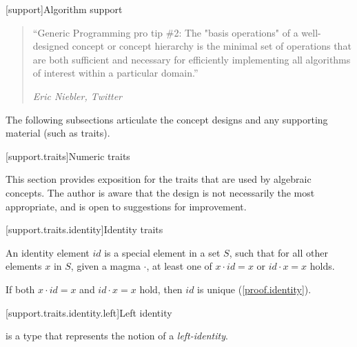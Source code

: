 [support]{Algorithm support}

\begin{quote}
``Generic Programming pro tip \#2: The "basis operations" of a well-designed concept or concept
hierarchy is the minimal set of operations that are both sufficient and necessary for efficiently
implementing all algorithms of interest within a particular domain.''
\begin{flushright}
\textemdash \textit{Eric Niebler, Twitter}
\end{flushright}
\end{quote}

The following subsections articulate the concept designs and any supporting material (such as
traits).


[support.traits]{Numeric traits}

This section provides exposition for the traits that are used by algebraic concepts. The author is
aware that the design is not necessarily the most appropriate, and is open to suggestions for
improvement.

[support.traits.identity]{Identity traits}

\pnum
An identity element $id$ is a special element in a set $S$, such that for all other elements $x$ in
$S$, given a magma $\cdot$, at least one of $x \cdot id = x$ or $id \cdot x = x$ holds.

\pnum
If both $x \cdot id = x$ and $id \cdot x = x$ hold, then $id$ is unique (\ref{proof.identity}).

[support.traits.identity.left]{Left identity}

\pnum
{} is a type that represents the notion of a \textit{left-identity}.

